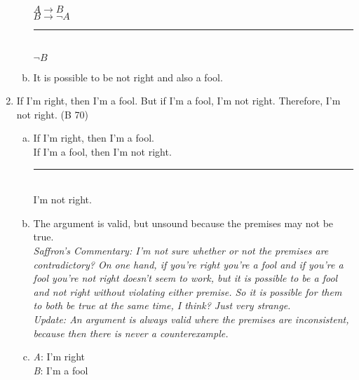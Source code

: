 \documentclass{article}
\begin{document}
\begin{enumerate}
\begin{enumerate}[(a)]
                        $A \to B$\\
                        $B \to \neg A$\\
                        \rule{5em}{.5pt}\\
                        $\neg B$
                        \setcounter{enumii}{4}
                  \item  It is possible to be not right and also a fool.
            \end{enumerate}
      \item If I'm right, then I'm a fool. But if I'm a fool, I'm not right. Therefore, I'm not right. (B 70)
            \begin{enumerate}[(a)]
                  \item If I'm right, then I'm a fool.\\
                        If I'm a fool, then I'm not right.\\
                        \rule{15em}{.5pt}\\
                        I'm not right.
                  \item The argument is valid, but unsound because the premises may not be true.\\
                        \textit{Saffron's Commentary: I'm not sure whether or not the premises are contradictory? On one hand, if you're right you're a fool and if you're a fool you're not right doesn't seem to work, but it is possible to be a fool and not right without violating either premise. So it is possible for them to both be true at the same time, I think? Just very strange.\\
                              Update: An argument is always valid where the premises are inconsistent, because then there is never a counterexample.}
                  \item \textit{A}: I'm right\\
                        \textit{B}: I'm a fool\\


\end{enumerate}
\end{enumerate}
\end{document}
